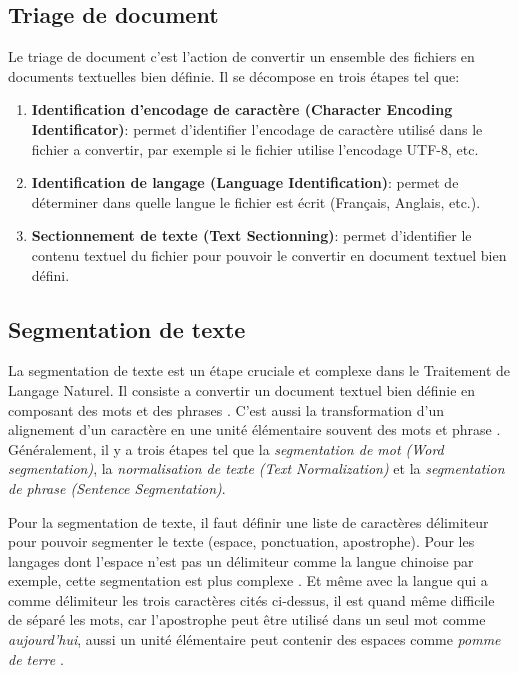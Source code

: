 \subsection{Triage de document}
Le triage de document c'est l'action de convertir un ensemble des fichiers en documents textuelles bien définie. Il se décompose en trois étapes tel que:
\begin{enumerate}
    \item \textbf{Identification d'encodage de caractère (Character Encoding Identificator)}: permet d'identifier l'encodage de caractère utilisé dans le fichier a convertir, par exemple si le fichier utilise l'encodage UTF-8, etc.
    \item \textbf{Identification de langage (Language Identification)}: permet de déterminer dans quelle langue le fichier est écrit (Français, Anglais, etc.).
    \item \textbf{Sectionnement de texte (Text Sectionning)}: permet d'identifier le contenu textuel du fichier pour pouvoir le convertir en document textuel bien défini.
\end{enumerate}

\subsection{Segmentation de texte}
La segmentation de texte est un étape cruciale et complexe dans le Traitement de Langage Naturel. Il consiste a convertir un document textuel bien définie en composant des mots et des phrases \citep{handbook-nlp}. C'est aussi la transformation d'un alignement d'un caractère en une unité élémentaire souvent des mots et phrase \citep{automatic-nlp}. Généralement, il y a trois étapes tel que la \textit{segmentation de mot (Word segmentation)}, la \textit{normalisation de texte (Text Normalization)} et la \textit{segmentation de phrase (Sentence Segmentation)}.

Pour la segmentation de texte, il faut définir une liste de caractères délimiteur pour pouvoir segmenter le texte (espace, ponctuation, apostrophe). Pour les langages dont l'espace n'est pas un délimiteur comme la langue chinoise par exemple, cette segmentation est plus complexe \citep{handbook-nlp}. Et même avec la langue qui a comme délimiteur les trois caractères cités ci-dessus, il est quand même difficile de séparé les mots, car l'apostrophe peut être utilisé dans un seul mot comme \textit{aujourd'hui}, aussi un unité élémentaire peut contenir des espaces comme \textit{pomme de terre} \citep{automatic-nlp}.

